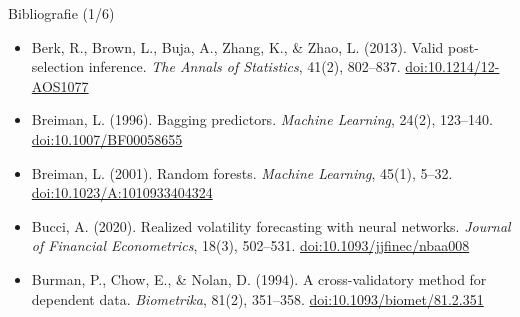 \begin{frame}{Bibliografie (1/6)}
\begin{itemize}
    \item Berk, R., Brown, L., Buja, A., Zhang, K., \& Zhao, L. (2013). Valid post-selection inference. \textit{The Annals of Statistics}, 41(2), 802--837. \href{https://doi.org/10.1214/12-AOS1077}{doi:10.1214/12-AOS1077}
    \item Breiman, L. (1996). Bagging predictors. \textit{Machine Learning}, 24(2), 123--140. \href{https://doi.org/10.1007/BF00058655}{doi:10.1007/BF00058655}
    \item Breiman, L. (2001). Random forests. \textit{Machine Learning}, 45(1), 5--32. \href{https://doi.org/10.1023/A:1010933404324}{doi:10.1023/A:1010933404324}
    \item Bucci, A. (2020). Realized volatility forecasting with neural networks. \textit{Journal of Financial Econometrics}, 18(3), 502--531. \href{https://doi.org/10.1093/jjfinec/nbaa008}{doi:10.1093/jjfinec/nbaa008}
    \item Burman, P., Chow, E., \& Nolan, D. (1994). A cross-validatory method for dependent data. \textit{Biometrika}, 81(2), 351--358. \href{https://doi.org/10.1093/biomet/81.2.351}{doi:10.1093/biomet/81.2.351}
\end{itemize}
\end{frame}

